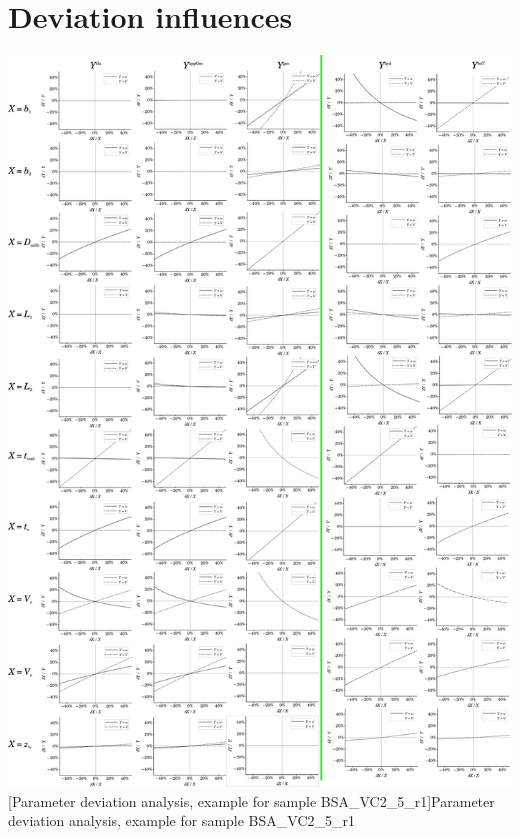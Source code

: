 \section*{Deviation influences}
  \begin{minipage}{\linewidth}
    \includegraphics[width=.925\linewidth]{./images/deltaAnalysis.pdf}
  \vspace*{-3ex}
  [Parameter deviation analysis, example for sample BSA\_VC2\_5\_r1]{Parameter deviation analysis, 
  example for sample 
  BSA\_VC2\_5\_r1}
  \label{fig:DeviationAnalysis}
  \end{minipage}
\FloatBarrier
\restoregeometry
